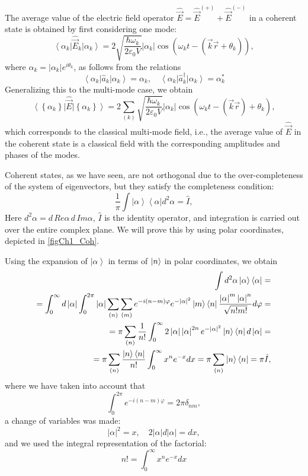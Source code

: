 The average value of the electric field operator $\hat{\vec{E}} =
\hat{\vec{E}}^{(+)} + \hat{\vec{E}}^{(-)}$ in a coherent
state is obtained by first considering one mode: 
\[
\left<\alpha_{k}\right|\hat{\vec{E}}_k\left|\alpha_{k}\right> = 2
\sqrt{\frac{\hbar \omega_k}{2 \varepsilon_0
V}}\left|\alpha_{k}\right|\cos 
\left(\omega_k t - \left(\vec{k} \vec{r} + \theta_k\right) \right),
\]
where $\alpha_k = \left|\alpha_{k}\right| e^{i \theta_k}$, as follows from the relations
\[
\left<\alpha_k\right|\hat{a}_k\left|\alpha_k\right> = \alpha_k, \quad
\left<\alpha_k\right|\hat{a}^{\dag}_k\left|\alpha_k\right> = \alpha^{*}_k
\]
Generalizing this to the multi-mode case, we obtain
\begin{equation}
\left<\left\{\alpha_{k}\right\}\right|\hat{\vec{E}}\left|\left\{\alpha_{k}\right\}\right>
= 2 \sum_{(k)} \sqrt{\frac{\hbar \omega_k}{2 \varepsilon_0
V}} \left|\alpha_k\right|\cos \left(\omega_k t -
\left(\vec{k}\vec{r}\right) + \theta_k \right),
\end{equation}
which corresponds to the classical multi-mode field, i.e., the average
value of $\hat{\vec{E}}$ in the coherent state is
a classical field with the corresponding amplitudes and phases of the modes. 

Coherent states, as we have seen, are not orthogonal due to
the over-completeness of the system of eigenvectors, but they satisfy
the completeness condition: 
\begin{equation}
\frac{1}{\pi}\int \left|\alpha\right>\left<\alpha\right| d^2 \alpha =
\hat{I},
\label{eqCh1_full4coh}
\end{equation}
Here $d^2 \alpha = d\, Re \alpha\, d\, Im \alpha$, $\hat{I}$ is the identity
operator, and integration is carried out over the entire complex
plane. We will prove this by using polar coordinates,
depicted in \autoref{figCh1_Coh}.  



Using the expansion of $\left|\alpha\right>$ in terms of $\ket{n}$ in
polar coordinates, we obtain 
\begin{eqnarray}
\int d^2 \alpha \left|\alpha\right>\left<\alpha\right| =
\nonumber \\
=
\int_0^{\infty} d \left|\alpha\right|\int_0^{2
  \pi}\left|\alpha\right|\sum_{(n)}\sum_{(m)}e^{-i \left(n -
  m\right)\varphi}
e^{-\left|\alpha\right|^2}\ket{m}\bra{n}
\frac{\left|\alpha\right|^m \left|\alpha\right|^n}{\sqrt{n! m!}} d\varphi
= 
\nonumber \\
= \pi \sum_{(n)}\frac{1}{n!}\int_0^{\infty} 2
\left|\alpha\right|\left|\alpha\right|^{2n} e^{-\left|\alpha\right|^2} 
\ket{n}\bra{n}
d\left|\alpha\right| = 
\nonumber \\
=
\pi
\sum_{(n)}\frac{\ket{n}\bra{n}}{n!} \int_0^{\infty}x^n
e^{-x}dx = 
\pi \sum_{(n)}\ket{n}\bra{n} = \pi \hat{I},
\end{eqnarray}
where we have taken into account that
\[
\int_0^{2\pi} e^{-i \left(n - m\right)\varphi} = 2 \pi \delta_{nm},
\]
a change of variables was made:  
\[
\left|\alpha\right|^2 = x, \quad 2 \left|\alpha\right| d
\left|\alpha\right| = d x,
\]
and we used the integral representation of the factorial:
\[
n! = \int_0^{\infty}x^ne^{-x}dx
\]

